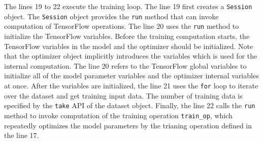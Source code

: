 The lines 19 to 22 execute the training loop. 
The line 19 first creates a {\tt Session} object.
The {\tt Session} object provides the {\tt run} method that can invoke
computation of TensorFlow operations.
The line 20 uses the {\tt run} method to initialize the TensorFlow variables.
Before the training computation starts,
the TensorFlow variables in the model and the optimizer should be initialized.
Note that the optimizer object implicitly introduces the variables which is
used for the internal computation.
The line 20 refers to the TensorFlow global variables to initialize
all of the model parameter variables and the optimizer internal variables
at once.
After the variables are initialized, the line 21 uses the {\tt for} loop
to iterate over the dataset and get training input data. 
The number of training data is specified by the {\tt take} API of the
dataset object.
Finally, the line 22 calls the {\tt run} method to
invoke computation of the training operation {\tt train\_op},
which repeatedly optimizes the model parameters by the trianing operation
defined in the line 17.
